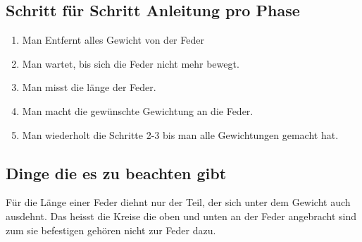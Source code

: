 \documentclass[../main.tex]{subfiles} %
\begin{document}
    \subsection{Schritt für Schritt Anleitung pro Phase}\label{subsec:schritt-für-schritt-anleitung}
    \begin{enumerate}
        \item Man Entfernt alles Gewicht von der Feder
        \item Man wartet, bis sich die Feder nicht mehr bewegt.
        \item Man misst die länge der Feder.
        \item Man macht die gewünschte Gewichtung an die Feder.
        \item Man wiederholt die Schritte 2-3 bis man alle Gewichtungen gemacht hat.
    \end{enumerate}

    \subsection{Dinge die es zu beachten gibt}\label{subsec:dinge-die-es-zu-beachten-gibt}
    Für die Länge einer Feder diehnt nur der Teil, der sich unter dem Gewicht auch ausdehnt. 
    Das heisst die Kreise die oben und unten an der Feder angebracht sind zum sie befestigen gehören nicht zur Feder dazu.    
\end{document}
